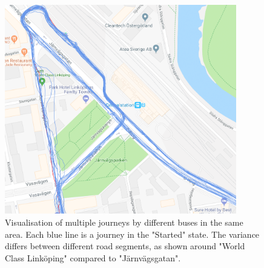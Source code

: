 \begin{figure}[ht!]
    \centering
    \includegraphics[width=0.9\textwidth]{figures/gps_variation}
    \caption[Visualisation of multiple journeys by different buses in the same area]
    {\small Visualisation of multiple journeys by different buses in the same area.
    Each blue line is a journey in the "Started" state.
    The variance differs between different road segments, as shown around "World Class Linköping" compared to "Järnvägsgatan".}
    \label{fig:gps-variation}
\end{figure}

